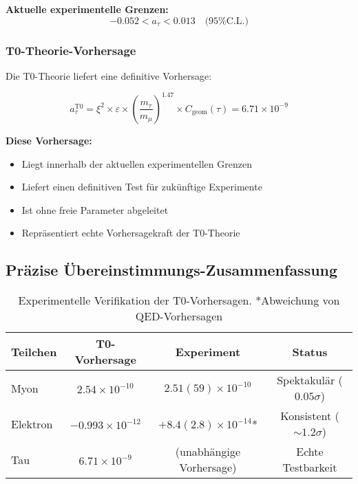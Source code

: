 \documentclass[12pt,a4paper]{article}
\numberwithin{equation}{section}
\newcommand{\xipar}{\xi}
\newcommand{\epsilonT}{\varepsilon}
\newcommand{\Cgeom}{C_{\text{geom}}}
\begin{document}
	\textbf{Aktuelle experimentelle Grenzen:}
	\begin{equation}
		-0.052 < a_\tau < 0.013 \quad \text{(95\% C.L.)}
		\label{eq:tau_experimental_bounds}
	\end{equation}
	
	\subsubsection{T0-Theorie-Vorhersage}
	
	Die T0-Theorie liefert eine definitive Vorhersage:
	
	\begin{equation}
		a_\tau^{\text{T0}} = \xipar^2 \times \epsilonT \times \left(\frac{m_\tau}{m_\mu}\right)^{1.47} \times \Cgeom(\tau) = 6.71 \times 10^{-9}
		\label{eq:tau_t0_prediction}
	\end{equation}
	
	\textbf{Diese Vorhersage:}
	\begin{itemize}
		\item Liegt innerhalb der aktuellen experimentellen Grenzen
		\item Liefert einen definitiven Test für zukünftige Experimente
		\item Ist ohne freie Parameter abgeleitet
		\item Repräsentiert echte Vorhersagekraft der T0-Theorie
	\end{itemize}
	
	\subsection{Präzise Übereinstimmungs-Zusammenfassung}
	
	\begin{table}[h]
		\centering
		\begin{tabular}{lccc}
			\toprule
			\textbf{Teilchen} & \textbf{T0-Vorhersage} & \textbf{Experiment} & \textbf{Status} \\
			\midrule
			Myon & $2.54 \times 10^{-10}$ & $2.51(59) \times 10^{-10}$ & Spektakulär ($0.05\sigma$) \\
			Elektron & $-0.993 \times 10^{-12}$ & $+8.4(2.8) \times 10^{-14}$* & Konsistent ($\sim 1.2\sigma$) \\
			Tau & $6.71 \times 10^{-9}$ & (unabhängige Vorhersage) & Echte Testbarkeit \\
			\bottomrule
		\end{tabular}
		\caption{Experimentelle Verifikation der T0-Vorhersagen. *Abweichung von QED-Vorhersagen}
		\label{tab:experimental_verification}
	\end{table}
	
\end{document}
